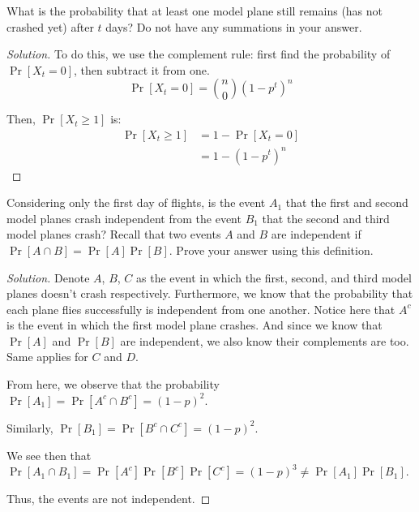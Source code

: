 \documentclass{article}
\newenvironment{solution}{\begin{proof}[Solution]}{\end{proof}}
\begin{document}
\begin{hw}
	What is the probability that at least one model plane still remains (has not crashed yet) after $t$ days? Do not have any summations in your answer.
\end{hw}
\begin{solution}
	To do this, we use the complement rule: first find the probability of $\Pr[X_{t} = 0]$, then subtract it from one.
	\begin{equation*}
		\Pr[X_{t} = 0] = \binom{n}{0}(1-p^{t})^{n}
	\end{equation*}

	Then, $\Pr[X_{t} \geq 1]$ is:
	\begin{align*}
		\Pr[X_{t} \geq 1] &= 1 - \Pr[X_{t} = 0] \\
		&= 1 - (1-p^{t})^{n}
	\end{align*}
\end{solution}

\begin{hw}
	Considering only the first day of flights, is the event $A_1$ that the first and second model planes crash independent from the event $B_1$ that the second and third model planes crash? Recall that two events $A$ and $B$ are independent if $\Pr[A\cap B] = \Pr[A]\Pr[B]$. Prove your answer using this definition.
\end{hw}
\begin{solution}
	Denote $A$, $B$, $C$ as the event in which the first, second, and third model planes doesn't crash respectively. Furthermore, we know that the probability that each plane flies successfully is independent from one another. Notice here that $A^{c}$ is the event in which the first model plane crashes. And since we know that $\Pr[A]$ and $\Pr[B]$ are independent, we also know their complements are too. Same applies for $C$ and $D$.
	
	From here, we observe that the probability $\Pr[A_{1}] = \Pr[A^{c} \cap B^{c}] = (1-p)^{2}$.
	
	Similarly, $\Pr[B_{1}] = \Pr[B^{c} \cap C^{c}] = (1-p)^{2}$.
	
	We see then that $\Pr[A_{1} \cap B_{1}] = \Pr[A^{c}]\Pr[B^{c}]\Pr[C^{c}] = (1-p)^{3} \not= \Pr[A_{1}]\Pr[B_{1}]$.
	
	Thus, the events are not independent.
\end{solution}
\end{document}
